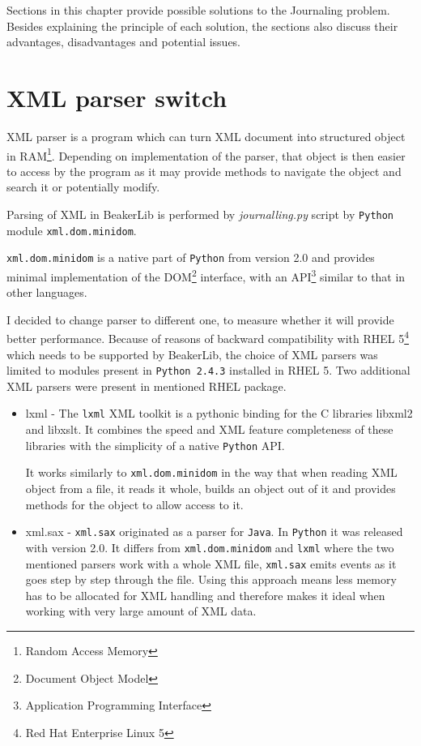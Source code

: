 Sections in this chapter provide possible solutions to the Journaling problem. Besides explaining the principle of each solution, the sections also discuss their advantages, disadvantages and potential issues.

\section{XML parser switch}
XML parser is a program which can turn XML document into structured object in RAM\footnote{Random Access Memory}. Depending on implementation of the parser, that object is then easier to access by the program as it may provide methods to navigate the object and search it or potentially modify. 

Parsing of XML in BeakerLib is performed by \textit{journalling.py} script by \texttt{Python} module \texttt{xml.dom.minidom}\cite{minidom_doc}. 

 \texttt{xml.dom.minidom} is a native part of \texttt{Python} from version 2.0 and provides minimal implementation of the DOM\footnote{Document Object Model} interface, with an API\footnote{Application Programming Interface} similar to that in other languages. 

I decided to change parser to different one, to measure whether it will provide better performance. Because of reasons of backward compatibility with RHEL 5\footnote{Red Hat Enterprise Linux 5} which needs to be supported by BeakerLib, the choice of XML parsers was limited to modules present in \texttt{Python 2.4.3} installed in RHEL 5. Two additional XML parsers were present in mentioned RHEL package.

\begin{itemize}
\item lxml - The \texttt{lxml} XML toolkit is a pythonic binding for the C libraries libxml2 and libxslt. It combines the speed and XML feature completeness of these libraries with the simplicity of a native \texttt{Python} API\cite{lxml_doc}.

It works similarly to \texttt{xml.dom.minidom} in the way that when reading XML object from a file, it reads it whole, builds an object out of it and provides methods for the object to allow access to it.
\item xml.sax  \cite{sax_doc} - \texttt{xml.sax} originated as a parser for \texttt{Java}\cite{Sax2}. In \texttt{Python} it was released with version 2.0. It differs from \texttt{xml.dom.minidom} and \texttt{lxml} where the two mentioned parsers work with a whole XML file,  \texttt{xml.sax} emits events as it goes step by step through the file\cite{sax_example}. Using this approach means less memory has to be allocated for XML handling and therefore makes it ideal when working with very large amount of XML  data.
\end{itemize}

